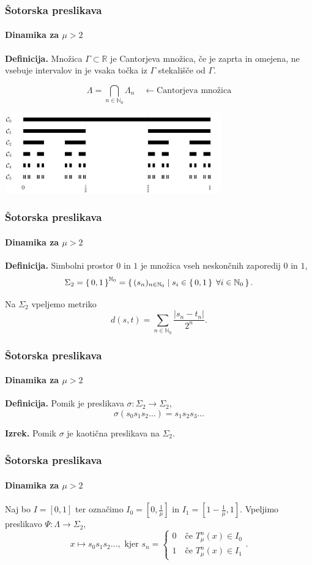 \documentclass[12pt]{beamer}
\newcommand{\R}{\mathbb R}
\newcommand{\N}{\mathbb N}
\begin{document}
\begin{frame}
\frametitle{Šotorska preslikava}
\framesubtitle{Dinamika za $\mu > 2$}

\textbf{Definicija.}
Množica $\Gamma \subset \R$ je Cantorjeva množica, če je zaprta in omejena, ne vsebuje intervalov in je vsaka točka iz $\Gamma$ stekališče od $\Gamma$.

$$ \Lambda = \bigcap_{n \in \N_0} \Lambda_n \quad \leftarrow \text{Cantorjeva množica} $$

\centering
\includegraphics[width=0.7\textwidth]{cantor_set.png}

\end{frame}


\begin{frame}
\frametitle{Šotorska preslikava}
\framesubtitle{Dinamika za $\mu > 2$}

\textbf{Definicija.}
Simbolni prostor $0$ in $1$ je množica vseh neskončnih zaporedij $0$ in $1$, $$ \Sigma_2 = \set{0,1}^{\N_0} = \set{ (s_n)_{n \in \N_0} \mid s_i \in \set{0,1} \; \forall i \in \N_0 }. $$

\bigskip

Na $\Sigma_2$ vpeljemo metriko $$ d(s,t) = \sum_{n \in \N_0} \frac{\vert s_n - t_n \vert}{2^n}. $$

\end{frame}


\begin{frame}
\frametitle{Šotorska preslikava}
\framesubtitle{Dinamika za $\mu > 2$}

\textbf{Definicija.}
Pomik je preslikava $\sigma: \Sigma_2 \rightarrow \Sigma_2$, $$ \sigma(s_0 s_1 s_2 \dots) = s_1 s_2 s_3 \dots $$

\bigskip

\textbf{Izrek.}
Pomik $\sigma$ je kaotična preslikava na $\Sigma_2$.

\end{frame}


\begin{frame}
\frametitle{Šotorska preslikava}
\framesubtitle{Dinamika za $\mu > 2$}

Naj bo $I=[0,1]$ ter označimo $I_0 = [0, \frac{1}{\mu}]$ in  $I_1 = [1 - \frac{1}{\mu}, 1]$. Vpeljimo preslikavo $\Psi: \Lambda \rightarrow \Sigma_2$,
\begin{equation*}
    x \mapsto s_0 s_1 s_2 \dots, \text{ kjer } s_n =
    \begin{cases}
        0 \quad \text{če } T_{\mu}^n(x) \in I_0 \\
        1 \quad \text{če } T_{\mu}^n(x) \in I_1
    \end{cases}.
\end{equation*}

\end{frame}
\end{document}
